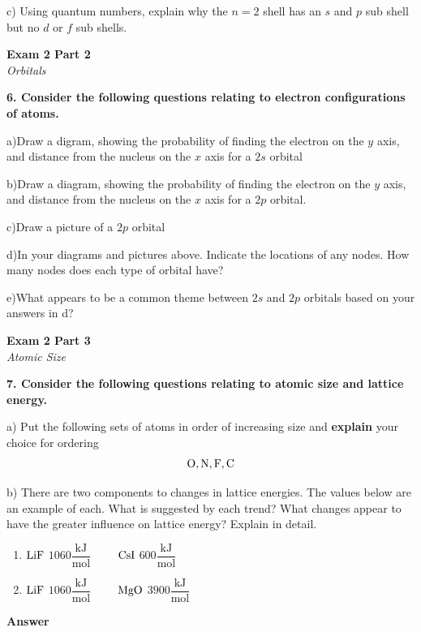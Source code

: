\documentclass{article}
\begin{document}
    c) Using quantum numbers, explain why the $n = 2$ shell has an $s$ and $p$ sub shell but no $d$ or $f$ sub shells.
    \pagebreak

    \begin{center}
        \textbf{Exam 2 Part 2}\\
        \textit{Orbitals}
    \end{center}
    \textbf{6. Consider the following questions relating to electron configurations of atoms.}

    a)Draw a digram, showing the probability of finding the electron on the $y$ axis, and distance from the nucleus on the $x$ axis for a $2s$ orbital

    b)Draw a diagram, showing the probability of finding the electron on the $y$ axis, and distance from the nucleus on the $x$ axis for a $2p$ orbital.

    c)Draw a picture of a $2p$ orbital

    d)In your diagrams and pictures above. Indicate the locations of any nodes. How many nodes does each type of orbital have?

    e)What appears to be a common theme between $2s$ and $2p$ orbitals based on your answers in d?


    \pagebreak

    \begin{center}
        \textbf{Exam 2 Part 3}\\
        \textit{Atomic Size}
    \end{center}
    \textbf{7. Consider the following questions relating to atomic size and lattice energy.}

    a) Put the following sets of atoms in order of increasing size and \textbf{explain} your choice for ordering
    $$\ce{O}, \ce{N}, \ce{F}, \ce{C}$$

    b) There are two components to changes in lattice energies. The values below are an example of each. What is suggested by each trend? What changes appear to have the greater influence on lattice energy? Explain in detail.
    \begin{enumerate}
        \item $\ce{LiF}$ $1060 \dfrac{\si{\kilo\joule}}{\si{\mole}} \qquad$ $\ce{CsI}$  $600 \dfrac{\si{\kilo\joule}}{\si{\mole}}$
        \item  $\ce{LiF}$ $1060 \dfrac{\si{\kilo\joule}}{\si{\mole}} \qquad$ $\ce{MgO}$  $3900 \dfrac{\si{\kilo\joule}}{\si{\mole}}$
    \end{enumerate}
    \textbf{Answer}\\
\end{document}
